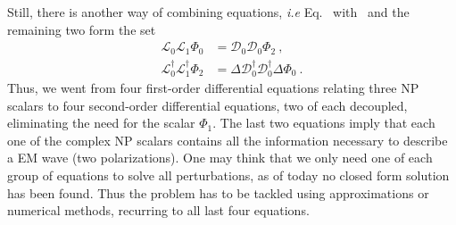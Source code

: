 Still, there is another way of combining equations, \emph{i.e} Eq.~ with~ and the remaining two form the set
\begin{align}
    \label{eq3:LLPhi0DDPhi2}
    \mathscr{L}_0 \mathscr{L}_1 \Phi_0 &= \mathscr{D}_0 \mathscr{D}_0 \Phi_2 ~,\\
    \label{eq3:LLPhi2DDPhi0}
    \mathscr{L}^\dagger_0 \mathscr{L}^\dagger_1 \Phi_2 &= \Delta \mathscr{D}^\dagger_0 \mathscr{D}^\dagger_0 \Delta \Phi_0 ~.
\end{align}
Thus, we went from four first-order differential equations relating three NP scalars to four second-order differential equations, two of each decoupled, eliminating the need for the scalar $\Phi_1$.
The last two equations imply that each one of the complex NP scalars contains all the information necessary to describe a EM wave (two polarizations).
One may think that we only need one of each group of equations to solve all perturbations, as of today no closed form solution has been found.
Thus the problem has to be tackled using approximations or numerical methods, recurring to all last four equations.

